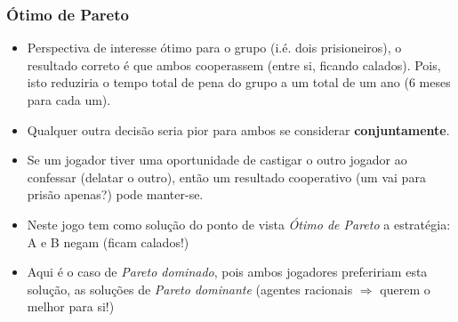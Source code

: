 

\begin{frame}
    \frametitle{Ótimo de Pareto}

 \begin{itemize}
  
 
   \item Perspectiva de interesse ótimo para o grupo (i.é. dois prisioneiros), o resultado correto é que  ambos cooperassem (entre si, ficando calados).   Pois,  isto reduziria o tempo total de pena do grupo a um total de um ano (6 meses para cada um).

   \item  Qualquer outra decisão seria pior para ambos se considerar \textbf{conjuntamente}.

\item Se um jogador tiver uma oportunidade de castigar o outro jogador ao confessar (delatar o outro), então um resultado cooperativo (um vai para prisão apenas?) pode manter-se.

\pause
   
   
\item Neste jogo tem como solução do ponto de vista \textit{Ótimo de Pareto} a estratégia: A e B negam (ficam calados!)

\item Aqui  é o caso de \textit{Pareto dominado}, pois ambos jogadores prefeririam esta solução, as soluções de \textit{Pareto dominante} (agentes racionais $\Rightarrow $ querem o melhor para si!)
     
 \end{itemize}
 
 
\end{frame}
 
